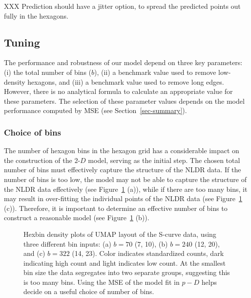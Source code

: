 \documentclass[
  12pt]{article}
\newcommand\gD{$2\text{-}D$}
\begin{document}
XXX Prediction should have a jitter option, to spread the predicted
points out fully in the hexagons.

\subsection{Tuning}\label{tuning}

The performance and robustness of our model depend on three key
parameters: (i) the total number of bins (\(b\)), (ii) a benchmark value
used to remove low-density hexagons, and (iii) a benchmark value used to
remove long edges. However, there is no analytical formula to calculate
an appropriate value for these parameters. The selection of these
parameter values depends on the model performance computed by MSE (see
Section~\ref{sec-summary}).

\subsubsection{Choice of bins}\label{choice-of-bins}

The number of hexagon bins in the hexagon grid has a considerable impact
on the construction of the \gD{} model, serving as the initial step. The
chosen total number of bins must effectively capture the structure of
the NLDR data. If the number of bins is too low, the model may not be
able to capture the structure of the NLDR data effectively (see
Figure~\ref{fig-bins-scurve} (a)), while if there are too many bins, it
may result in over-fitting the individual points of the NLDR data (see
Figure~\ref{fig-bins-scurve} (c)). Therefore, it is important to
determine an effective number of bins to construct a reasonable model
(see Figure~\ref{fig-bins-scurve} (b)).

\begin{figure}[H]


\caption{\label{fig-bins-scurve}Hexbin density plots of UMAP layout of
the S-curve data, using three different bin inputs: (a) \(b = 70\) (7,
10), (b) \(b = 240\) (12, 20), and (c) \(b = 322\) (14, 23). Color
indicates standardized counts, dark indicating high count and light
indicates low count. At the smallest bin size the data segregates into
two separate groups, suggesting this is too many bins. Using the MSE of
the model fit in \(p-D\) helps decide on a useful choice of number of
bins.}

\end{figure}%
\end{document}
